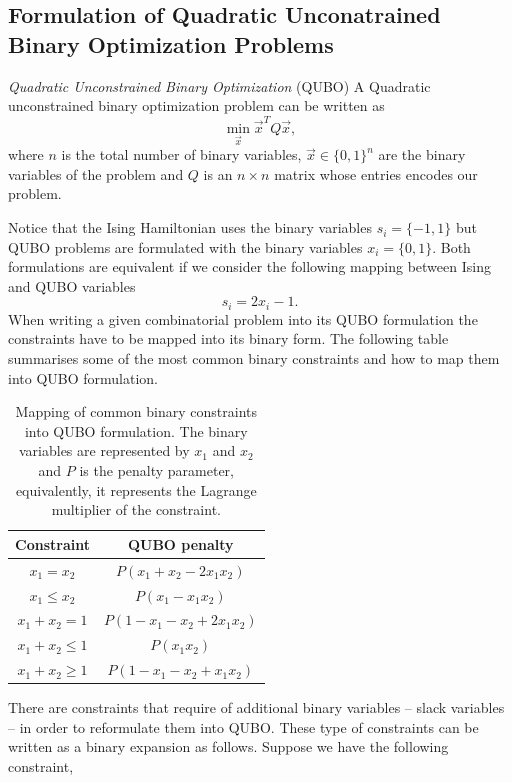 \subsection{Formulation of Quadratic Unconatrained Binary Optimization Problems}
\begin{definition}{\textit{Quadratic Unconstrained Binary Optimization} (QUBO)}
   A Quadratic unconstrained binary optimization problem can be written as
\begin{equation}
    \min_{\vec{x}}\vec{x}^{T}Q\vec{x},
\end{equation}
where $n$ is the total number of binary variables, $\vec{x}\in\{0,1\}^{n}$ are the binary variables of the problem and $Q$ is an $n\times n$ matrix whose entries encodes our problem.
\end{definition}
Notice that the Ising Hamiltonian uses the binary variables $s_{i} = \{-1,1\}$ but QUBO problems are formulated with the binary variables $x_{i} = \{0,1\}$. Both formulations are equivalent if we consider the following mapping between Ising and QUBO variables
\begin{equation}
\label{eq: ISING_QUBO}
    s_{i} = 2x_{i} - 1.
\end{equation}
When writing a given combinatorial problem into its QUBO formulation the constraints have to be mapped into its binary form. The following table summarises some of the most common binary constraints and how to map them into QUBO formulation.
\begin{table}[H]
\centering
\begin{tabular}{ |c||c| }
 \hline
 \textbf{Constraint} & \textbf{QUBO penalty} \\
 \hline
 $x_{1}=x_{2}$ & $P\left(x_{1} + x_{2} -2x_{1}x_{2}\right)$  \\
 $x_{1}\leq x_{2}$ &  $P\left(x_{1} -x_{1}x_{2}\right)$   \\
 $x_{1} + x_{2} = 1$ & $P\left(1-x_{1}-x_{2}+2x_{1}x_{2}\right)$ \\
 $x_{1} + x_{2} \leq 1$    & $P\left(x_{1}x_{2}\right)$ \\
$x_{1} + x_{2} \geq 1$ &   $P\left(1-x_{1}-x_{2}+x_{1}x_{2}\right)$ \\
 \hline
\end{tabular}
\caption{Mapping of common binary constraints into QUBO formulation. The binary variables are represented by $x_{1}$ and $x_{2}$ and $P$ is the penalty parameter, equivalently, it represents the Lagrange multiplier of the constraint.}
\end{table}
There are constraints that require of additional binary variables -- slack variables -- in order to reformulate them into QUBO. These type of constraints can be written as a binary expansion as follows. Suppose we have the following constraint,
